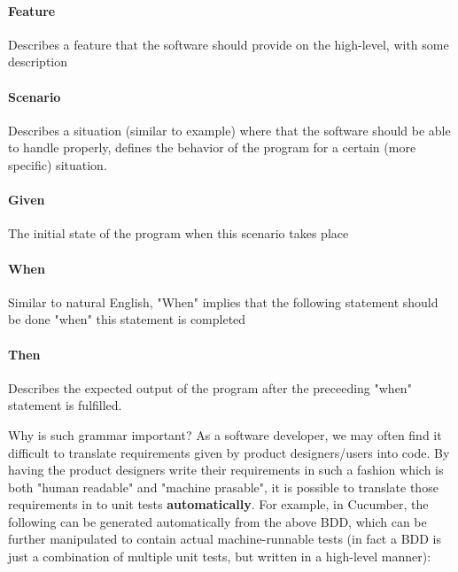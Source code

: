 \paragraph{Feature}

Describes a feature that the software should provide on the high-level, with some description

\paragraph{Scenario}

Describes a situation (similar to example) where that the software should be able to handle properly, defines the behavior of the program for a certain (more specific) situation. 

\paragraph{Given}

The initial state of the program when this scenario takes place

\paragraph{When}

Similar to natural English, "When" implies that the following statement should be done "when" this statement is completed

\paragraph{Then}

Describes the expected output of the program after the preceeding "when" statement is fulfilled. 

Why is such grammar important? As a software developer, we may often find it difficult to translate requirements given by product designers/users into code. By having the product designers write their requirements in such a fashion which is both "human readable" and "machine prasable", it is possible to translate those requirements in to unit tests \textbf{automatically}. For example, in Cucumber, the following can be generated automatically from the above BDD, which can be further manipulated to contain actual machine-runnable tests (in fact a BDD is just a combination of multiple unit tests, but written in a high-level manner):


